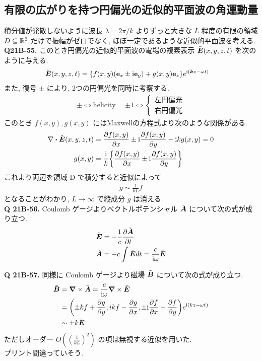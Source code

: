 \documentclass[a4paper,dvipdfmx]{jsarticle}
\theoremstyle{definition}
\begin{document}
\subsection{有限の広がりを持つ円偏光の近似的平面波の角運動量}
積分値が発散しないように波長 $\lambda=2\pi/k$ よりずっと大きな $L$ 程度の有限の領域 $D\subseteq\RR^2$ だけで振幅がゼロでなく, ほぼ一定であるような近似的平面波を考える. \\

\textbf{Q21B-55.}
このとき円偏光の近似的平面波の電場の複素表示 $\ET(x,y,z,t)$ を次のように与える.
\begin{align}
  \ET(x,y,z,t) & = \qty{f(x,y)(\vb{e}_x\pm\ii\vb{e}_y) + g(x,y)\vb{e}_z}e^{\ii(\kk z-\omega t)} \label{def ET D}
\end{align}
また, 復号 $\pm$ により, 2つの円偏光を同時に考察する.
\begin{align}
  \pm\iff \mathrm{helicity} = \pm 1 \iff \begin{cases}
                                           左円偏光 \\
                                           右円偏光
                                         \end{cases}
\end{align}
このとき $f(x,y), g(x,y)$ にはMaxwellの方程式より次のような関係がある.
\begin{align}
  \nabla\vdot\ET(x,y,z,t) & = \pdv{f(x,y)}{x}\pm\ii\pdv{f(x,y)}{y} - \ii kg(x,y) = 0  \\
  g(x,y)                  & = \frac{\ii}{k}\qty{\pdv{f(x,y)}{x}\pm\ii\pdv{f(x,y)}{y}}
\end{align}
これより両辺を領域 D で積分すると近似によって
\begin{align}
  g\sim\frac{1}{kL}f
\end{align}
となることがわかり, $L\to\infty$ で縦成分 $g$ は消える. \\

\textbf{Q 21B-56.}
Coulomb ゲージよりベクトルポテンシャル $\tilde{\AA}$ について次の式が成り立つ.
\begin{align}
  \ET         & = -\frac{1}{c}\pdv{\tilde{\AA}}{t}      \\
  \tilde{\AA} & = -c\int\ET dt = \frac{c}{\ii\omega}\ET
\end{align}

\textbf{Q 21B-57.}
同様に Coulomb ゲージより磁場 $\tilde{\BB}$ について次の式が成り立つ.
\begin{align}
  \tilde{\BB} & = \vnabla\times\tilde{\AA} = \frac{c}{\ii\omega}\vnabla\times\ET                                \\
              & = \qty(\pm kf + \pdv{g}{y}, ikf -\pdv{g}{x}, \pm\ii\pdv{f}{x} - \pdv{f}{y})e^{\ii(kz-\omega t)} \\
              & \sim \pm k\ET
\end{align}
ただしオーダー $O((\frac{1}{kL})^2)$ の項は無視する近似を用いた. \\
プリント間違っていそう. \\
\end{document}
